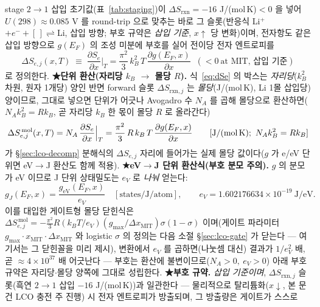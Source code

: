 \documentclass[11pt,a4paper]{article}
\newcommand{\rxn}{\mathrm{rxn}}
\begin{document}
stage $2\!\to\!1$ 삽입 초기값(표~\ref{tab:staging})이 $\Delta S_\rxn=-16$ J/(mol\,K)$<0$
을 넣어 $U(298)\approx0.085$ V 를 round-trip 으로 맞추는 바로 그 슬롯(반응식
Li$^+$$+e^-+[\,]\rightleftharpoons$Li, 삽입 방향; 부호 규약은 \emph{삽입 기준}, $x\!\uparrow$ 당 변화)이며,
전자항도 같은 삽입 방향으로 $g(E_F)$ 의 조성 미분에 부호를 실어 전이당 전자 엔트로피를
\begin{equation}
\boxed{\;\Delta S_{e,j}(x,T)\;\equiv\;\frac{\partial S_e}{\partial x}\Big|_T
=\frac{\pi^2}{3}\,k_B^2\,T\,\frac{\partial g(E_F,x)}{\partial x}\;\;(<0\ \text{at MIT, 삽입 기준})\;}
\label{eq:dSe}
\end{equation}
로 정의한다. \textbf{★단위 환산(자리당 $k_B$ $\to$ 몰당 $R$).} 식~\eqref{eq:dSe} 의 박스는 \emph{자리당}($k_B^2$ 차원, 원자 1개당) 양인 반면 forward 슬롯
$\Delta S_{\rxn,j}$ 는 \emph{몰당}(J/(mol\,K), Li 1몰 삽입당) 양이므로, 그대로 넣으면 단위가 어긋나 Avogadro 수
$N_A$ 를 곱해 몰당으로 환산하면($N_A k_B^2=R k_B$, 곧 자리당 $k_B$ 한 몫이 몰당 $R$ 로 올라간다)
\begin{equation}
\Delta S_{e,j}^{\,\mathrm{mol}}(x,T)=N_A\,\frac{\partial S_e}{\partial x}\Big|_T
=\frac{\pi^2}{3}\,R\,k_B\,T\,\frac{\partial g(E_F,x)}{\partial x}
\qquad[\text{J/(mol\,K)};\ N_A k_B^2=R k_B]
\label{eq:dSemolar}
\end{equation}
가 \S\ref{sec:lco-decomp} 분해식의 $\Delta S_{e,j}$ 자리에 들어가는 실제 몰당 값이다($g$ 가 e/eV 단위면 eV$\to$J
환산도 함께 적용). \textbf{★eV$\to$J 단위 환산식(부호 분모 주의).} $g$ 의 분모가 eV 이므로 J 단위 상태밀도는 $e_V$ 로 \emph{나눠} 얻는다:
\begin{equation}
g_J(E_F,x)=\frac{g_{\mathrm{eV}}(E_F,x)}{e_V}\quad[\text{states/J/atom}],
\qquad e_V=1.602176634\times10^{-19}\ \text{J/eV}.
\label{eq:gunit}
\end{equation}
이를 대입한 게이트형 몰당 닫힌식은 $\Delta S_{e,j}^{\,\mathrm{mol}}=-\tfrac{\pi^2}{3}R(k_BT/e_V)(g_{\max}/
\Delta x_\mathrm{MIT})\sigma(1-\sigma)$ 이며(게이트 파라미터 $g_{\max}\cdot x_\mathrm{MIT}\cdot\Delta x_\mathrm{MIT}$
와 logistic $\sigma$ 의 정의는 다음 소절 \S\ref{sec:lco-gate} 가 닫는다 — 여기서는 그 닫힌꼴을 미리 제시),
변환에서 $e_V$ 를 곱하면(나눗셈 대신) 결과가 $1/e_V^2$ 배, 곧
$\approx4\times10^{37}$ 배 어긋난다 — 부호는
환산에 불변이므로($N_A>0,\ e_V>0$) 아래 부호 규약은 자리당$\cdot$몰당 양쪽에 그대로 성립한다. \textbf{★부호 규약.} \emph{삽입 기준이며}, $\Delta S_{\rxn,j}$ 슬롯(흑연 $2\!\to\!1$ 삽입 $-16$ J/(mol\,K))과 일관한다 — 물리적으로
탈리튬화($x\!\downarrow$, 본 문건 LCO 충전 주 진행) 시 전자 엔트로피가 방출되며, 그 방출량은 게이트가 스스로
$$
\end{document}
